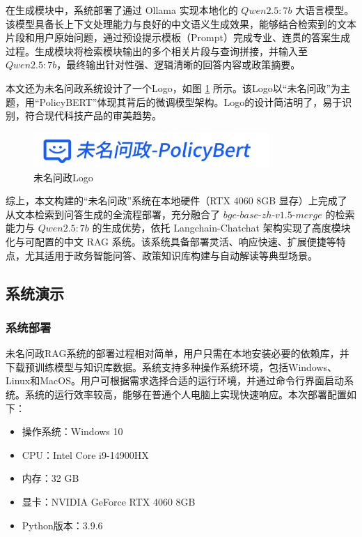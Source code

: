 \documentclass[12pt, a4paper]{ctexart}
\begin{document}
在生成模块中，系统部署了通过 Ollama 实现本地化的 $Qwen2.5:7b$ 大语言模型。该模型具备长上下文处理能力与良好的中文语义生成效果，能够结合检索到的文本片段和用户原始问题，通过预设提示模板（Prompt）完成专业、连贯的答案生成过程。生成模块将检索模块输出的多个相关片段与查询拼接，并输入至 $Qwen2.5:7b$，最终输出针对性强、逻辑清晰的回答内容或政策摘要。

本文还为未名问政系统设计了一个Logo，如图 \ref{fig:WeiMingLogo} 所示。该Logo以“未名问政”为主题，用“PolicyBERT”体现其背后的微调模型架构。Logo的设计简洁明了，易于识别，符合现代科技产品的审美趋势。

\begin{figure}[H]
    \centering
    \includegraphics[width=0.8\textwidth]{./images/WeiMingPolicyLogo.png}
    \caption{未名问政Logo}
    \label{fig:WeiMingLogo}
\end{figure}

综上，本文构建的“未名问政”系统在本地硬件（RTX 4060 8GB 显存）上完成了从文本检索到问答生成的全流程部署，充分融合了 $bge\text{-}base\text{-}zh\text{-}v1.5\text{-}merge$ 的检索能力与 $Qwen2.5:7b$ 的生成优势，依托 Langchain-Chatchat 架构实现了高度模块化与可配置的中文 RAG 系统。该系统具备部署灵活、响应快速、扩展便捷等特点，尤其适用于政务智能问答、政策知识库构建与自动解读等典型场景。

\subsection{系统演示}

\subsubsection{系统部署}
未名问政RAG系统的部署过程相对简单，用户只需在本地安装必要的依赖库，并下载预训练模型与知识库数据。系统支持多种操作系统环境，包括Windows、Linux和MacOS。用户可根据需求选择合适的运行环境，并通过命令行界面启动系统。系统的运行效率较高，能够在普通个人电脑上实现快速响应。本次部署配置如下：
\begin{itemize}
    \item 操作系统：Windows 10
    \item CPU：Intel Core i9-14900HX
    \item 内存：32 GB
    \item 显卡：NVIDIA GeForce RTX 4060 8GB
    \item Python版本：3.9.6
\end{itemize}
\end{document}
